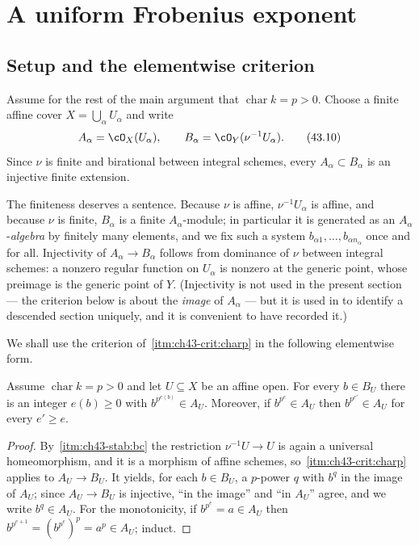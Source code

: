 \section{A uniform Frobenius exponent}
\label{sec:ch43-frobenius}

\subsection{Setup and the elementwise criterion}
\label{sec:ch43-frobenius-setup}

Assume for the rest of the main argument that
$\operatorname{char}k=p>0$.
Choose a finite affine cover $X=\bigcup_\alpha U_\alpha$ and write
\[
       A_\alpha=\cO_X(U_\alpha),
       \qquad
       B_\alpha=\cO_Y(\nu^{-1}U_\alpha).
\tag{43.10}\label{eq:bj-frobenius-affine-rings}
\]
Since $\nu$ is finite and birational between integral schemes, every
$A_\alpha\subset B_\alpha$ is an injective finite extension.

The finiteness deserves a sentence.  Because $\nu$ is affine,
$\nu^{-1}U_\alpha$ is affine, and because $\nu$ is finite,
$B_\alpha$ is a finite $A_\alpha$-module; in particular it is generated
as an $A_\alpha$-\emph{algebra} by finitely many elements, and we fix such
a system $b_{\alpha1},\ldots,b_{\alpha n_\alpha}$ once and for all.
Injectivity of $A_\alpha\to B_\alpha$ follows from dominance of $\nu$
between integral schemes: a nonzero regular function on $U_\alpha$ is
nonzero at the generic point, whose preimage is the generic point of $Y$.
(Injectivity is not used in the present section --- the criterion below is
about the \emph{image} of $A_\alpha$ --- but it is used in
 to identify a descended section uniquely, and it
is convenient to have recorded it.)

We shall use the criterion of
\,\cref{itm:ch43-crit:charp} in the following
elementwise form.

\begin{lemma}
\label{lem:ch43-elementwise-frobenius}
Assume $\operatorname{char}k=p>0$ and let $U\subseteq X$ be an affine
open.  For every $b\in B_U$ there is an integer $e(b)\ge0$ with
$b^{p^{e(b)}}\in A_U$.  Moreover, if $b^{p^e}\in A_U$ then
$b^{p^{e'}}\in A_U$ for every $e'\ge e$.
\end{lemma}

\begin{proof}
By \,\cref{itm:ch43-stab:bc} the restriction
$\nu^{-1}U\to U$ is again a universal homeomorphism, and it is a morphism
of affine schemes, so
\,\cref{itm:ch43-crit:charp} applies to
$A_U\to B_U$.  It yields, for each $b\in B_U$, a $p$-power $q$ with
$b^q$ in the image of $A_U$; since $A_U\to B_U$ is injective, ``in the
image'' and ``in $A_U$'' agree, and we write $b^q\in A_U$.  For the
monotonicity, if $b^{p^e}=a\in A_U$ then
$b^{p^{e+1}}=(b^{p^e})^p=a^p\in A_U$; induct.
\end{proof}

